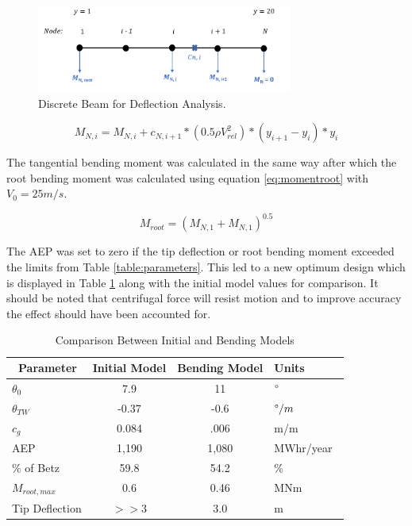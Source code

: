 \documentclass[11pt]{article}
\newcommand{\ra}[1]{\renewcommand{\arraystretch}{#1}}
\begin{document}
\begin{figure}[h!]
	\centering
	\includegraphics[width=0.75\textwidth]{DiscreteBeam}
	\caption{Discrete Beam for Deflection Analysis.}\label{fig:discretebeam}
\end{figure}

\begin{equation}
	\label{eq:momentnormal}
	M_{N,i} = M_{N,i} + c_{N,i+1}*(0.5\rho V_{rel}^2)*(y_{i+1}-y_{i})*y_{i}
\end{equation}
\FloatBarrier

The tangential bending moment was calculated in the same way after which the root bending moment was calculated using equation \ref{eq:momentroot} with $V_0 = 25 m/s$.

\begin{equation}
	\label{eq:momentroot}
	M_{root} = (M_{N,1} + M_{N,1})^{0.5}
\end{equation}
\FloatBarrier

The AEP was set to zero if the tip deflection or root bending moment exceeded the limits from Table \ref{table:parameters}. This led to a new optimum design which is displayed in Table \ref{table:bendingresults} along with the initial model values for comparison. It should be noted that centrifugal force will resist motion and to improve accuracy the effect should have been accounted for.

\begin{table}[!h]
\centering %
\ra{1.3}
\begin{tabular}{@{}lccl@{}}\toprule
\ \textbf{Parameter}  & \textbf{Initial Model}  & \textbf{Bending Model} &  \textbf{Units} \\
\midrule
$\theta_0$  & 7.9 & 11 & $\degree$ \ \\
$\theta_{TW}$ & -0.37 & -0.6 & $\degree/m$  \\
$c_{g}$ & 0.084 & .006 & m/m \ \\
\midrule
AEP  & 1,190 & 1,080 & MWhr/year\ \\
\% of Betz & 59.8 & 54.2 & \% \ \\
\midrule
$M_{root,max}$ & 0.6 & 0.46 & MNm \\
Tip Deflection  & $>>3$ & 3.0 & m \\
\bottomrule
\end{tabular}
\caption{Comparison Between Initial and Bending Models}
\label{table:bendingresults}
\end{table}
\end{document}

